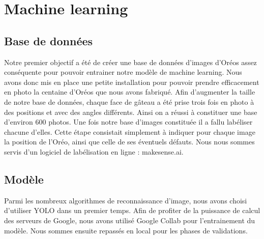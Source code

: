 \documentclass{article}
\begin{document}
\section{Machine learning}
\subsection{Base de données}
Notre premier objectif a été de créer une base de données d'images d'Oréos assez conséquente pour pouvoir entrainer notre modèle de machine learning. Nous avons donc mis en place une petite installation pour pouvoir prendre efficacement en photo la centaine d'Oréos que nous avons fabriqué. Afin d'augmenter la taille de notre base de données, chaque face de gâteau a été prise trois fois en photo à des positions et avec des angles différents. Ainsi on a réussi à constituer une base d'environ 600 photos.
Une fois notre base d'images constituée il a fallu labéliser chacune d'elles. Cette étape consistait simplement à indiquer pour chaque image la position de l'Oréo, ainsi que celle de ses éventuels défauts. Nous nous sommes servis d'un logiciel de labélisation en ligne : makesense.ai. 




\subsection{Modèle}
Parmi les nombreux algorithmes de reconnaissance d'image, nous avons choisi d'utiliser YOLO dans un premier temps.
Afin de profiter de la puissance de calcul des serveurs de Google, nous avons utilisé Google Collab pour l'entrainement du modèle. Nous sommes ensuite repassés en local pour les phases de validations.
\end{document}
